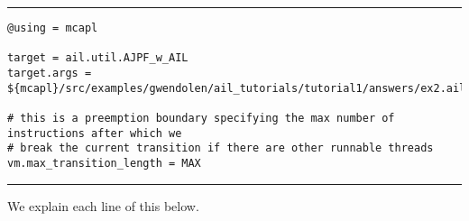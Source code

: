 \documentclass[a4]{article}
\begin{document}
\newpage
\noindent\rule{\textwidth}{1pt}
\begin{small}
\begin{verbatim}
@using = mcapl

target = ail.util.AJPF_w_AIL
target.args = ${mcapl}/src/examples/gwendolen/ail_tutorials/tutorial1/answers/ex2.ail,${mcapl}/src/examples/gwendolen/ajpf_tutorials/tutorial1/lifterandmedic.psl,1

# this is a preemption boundary specifying the max number of instructions after which we
# break the current transition if there are other runnable threads
vm.max_transition_length = MAX
\end{verbatim}
\end{small}
\rule{\textwidth}{1pt}

We explain each line of this below.
\end{document}
